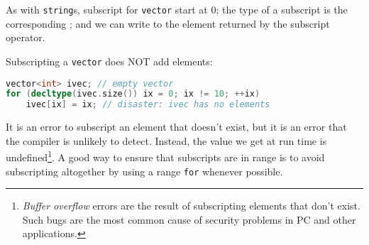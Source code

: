 As with \texttt{string}s, subscript for \texttt{vector} start at 0; the type of a subscript is the corresponding ; and we can write to the element returned by the subscript operator.

Subscripting a \texttt{vector} does NOT add elements:
\begin{lstlisting}[language=C++]
vector<int> ivec; // empty vector 
for (decltype(ivec.size()) ix = 0; ix != 10; ++ix) 
    ivec[ix] = ix; // disaster: ivec has no elements
\end{lstlisting}
It is an error to subscript an element that doesn’t exist, but it is an error that the compiler is unlikely to detect. Instead, the value we get at run time is undefined\footnote{\textit{Buffer overflow} errors are the result of subscripting elements that don’t exist. Such bugs are the most common cause of security problems in PC and other applications.}. A good way to ensure that subscripts are in range is to avoid subscripting altogether by using a range \texttt{for} whenever possible.
